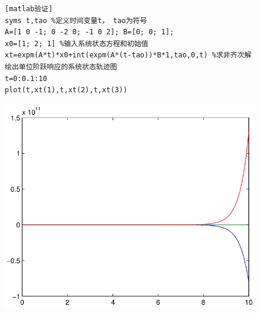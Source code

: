 \documentclass{article}
\begin{document}
\begin{figure}[!h]
\begin{minipage}[c]{0.45\textwidth}
\begin{verbatim}[matlab验证]
syms t,tao %定义时间变量t， tao为符号
A=[1 0 -1; 0 -2 0; -1 0 2]; B=[0; 0; 1];
x0=[1; 2; 1] %输入系统状态方程和初始值
xt=expm(A*t)*x0+int(expm(A*(t-tao))*B*1,tao,0,t) %求非齐次解
绘出单位阶跃响应的系统状态轨迹图
t=0:0.1:10
plot(t,xt(1),t,xt(2),t,xt(3))
\end{verbatim}
\end{minipage}
\begin{minipage}[c]{0.5\textwidth}
\includegraphics[width=\textwidth]{num2.png} 
\end{minipage}
\end{figure}
\end{document}
